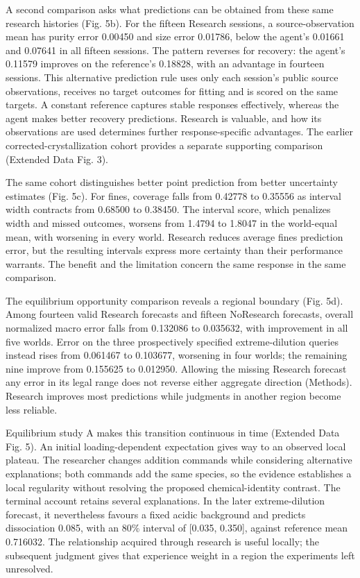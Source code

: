 \documentclass[10pt,a4paper]{article}
\begin{document}
A second comparison asks what predictions can be obtained from these same research histories (Fig. 5b). For the fifteen Research sessions, a source-observation mean has purity error 0.00450 and size error 0.01786, below the agent's 0.01661 and 0.07641 in all fifteen sessions. The pattern reverses for recovery: the agent's 0.11579 improves on the reference's 0.18828, with an advantage in fourteen sessions. This alternative prediction rule uses only each session's public source observations, receives no target outcomes for fitting and is scored on the same targets. A constant reference captures stable responses effectively, whereas the agent makes better recovery predictions. Research is valuable, and how its observations are used determines further response-specific advantages. The earlier corrected-crystallization cohort provides a separate supporting comparison (Extended Data Fig. 3).

The same cohort distinguishes better point prediction from better uncertainty estimates (Fig. 5c). For fines, coverage falls from 0.42778 to 0.35556 as interval width contracts from 0.68500 to 0.38450. The interval score, which penalizes width and missed outcomes, worsens from 1.4794 to 1.8047 in the world-equal mean, with worsening in every world. Research reduces average fines prediction error, but the resulting intervals express more certainty than their performance warrants. The benefit and the limitation concern the same response in the same comparison.

The equilibrium opportunity comparison reveals a regional boundary (Fig. 5d). Among fourteen valid Research forecasts and fifteen NoResearch forecasts, overall normalized macro error falls from 0.132086 to 0.035632, with improvement in all five worlds. Error on the three prospectively specified extreme-dilution queries instead rises from 0.061467 to 0.103677, worsening in four worlds; the remaining nine improve from 0.155625 to 0.012950. Allowing the missing Research forecast any error in its legal range does not reverse either aggregate direction (Methods). Research improves most predictions while judgments in another region become less reliable.

Equilibrium study A makes this transition continuous in time (Extended Data Fig. 5). An initial loading-dependent expectation gives way to an observed local plateau. The researcher changes addition commands while considering alternative explanations; both commands add the same species, so the evidence establishes a local regularity without resolving the proposed chemical-identity contrast. The terminal account retains several explanations. In the later extreme-dilution forecast, it nevertheless favours a fixed acidic background and predicts dissociation 0.085, with an 80\% interval of {[}0.035, 0.350{]}, against reference mean 0.716032. The relationship acquired through research is useful locally; the subsequent judgment gives that experience weight in a region the experiments left unresolved.
\end{document}
